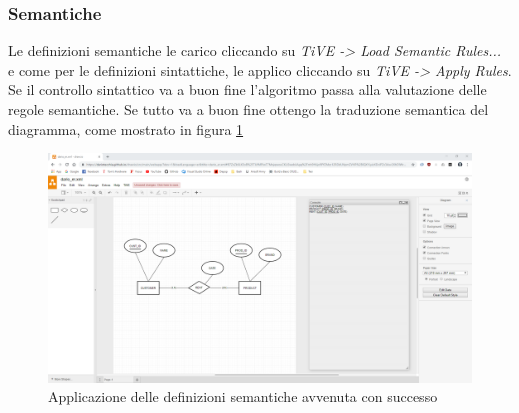             \subsubsection{Semantiche}
                Le definizioni semantiche le carico cliccando su  \textit{TiVE -> Load Semantic Rules...} e come per le definizioni sintattiche, le applico cliccando su \textit{TiVE -> Apply Rules}.
                \newline
                Se il controllo sintattico va a buon fine l'algoritmo passa alla valutazione delle regole semantiche. Se tutto va a buon fine ottengo la traduzione semantica del diagramma, come mostrato in figura \ref{fig:semanticOK}
                \begin{figure}[htbp]
                    \centering
                    \includegraphics[scale=0.25]{Figure/drawse/semanticOK.PNG}
                    \caption{Applicazione delle definizioni semantiche avvenuta con successo}
                    \label{fig:semanticOK}
                \end{figure}